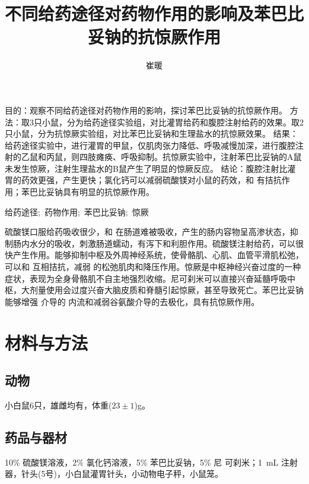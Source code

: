 \documentclass[lang=cn,11pt,a4paper,cite=super,AutoFakeBold,chinesefont=founder]{elegantpaper}
\title{不同给药途径对药物作用的影响及苯巴比妥钠的抗惊厥作用}
\author{崔暖}
\institute{（湖北民族大学\ 医学部，湖北恩施\ 445000）\vspace*{-3em}}
\date{}
\newcommand{\cnabs}{\noindent{\small \textsf{摘要}}\quad}
\newcommand{\cnkys}{\noindent{\small \textsf{关键词}}\quad}
\begin{document}
\maketitle

\renewcommand{\abstractname}{}

\begin{onecolabstract}
\cnabs
目的：观察不同给药途径对药物作用的影响，探讨苯巴比妥钠的抗惊厥作用。%
方法：取3只小鼠，分为给药途径实验组，对比灌胃给药和腹腔注射给药的效果。取2只小鼠，分为抗惊厥实验组，对比苯巴比妥钠和生理盐水的抗惊厥效果。%
结果：给药途径实验中，进行灌胃的甲鼠，仅肌肉张力降低、呼吸减慢加深，进行腹腔注射的乙鼠和丙鼠，则四肢瘫痪、呼吸抑制。抗惊厥实验中，注射苯巴比妥钠的A鼠未发生惊厥，注射生理盐水的B鼠产生了明显的惊厥反应。%
结论：腹腔注射比灌胃的药效更强，产生更快；氯化钙可以减弱硫酸镁对小鼠的药效，和 有拮抗作用；苯巴比妥钠具有明显的抗惊厥作用。%

\cnkys
给药途径;\ 药物作用;\ 苯巴比妥钠;\ 惊厥
\end{onecolabstract}

硫酸镁口服给药吸收很少，和 在肠道难被吸收\cite{cn2}，产生的肠内容物呈高渗状态，抑制肠内水分的吸收，刺激肠道蠕动，有泻下和利胆作用。硫酸镁注射给药，可以很快产生作用。能够抑制中枢及外周神经系统，使骨骼肌、心肌、血管平滑肌松弛，可以和 互相拮抗，减弱 的松弛肌肉和降压作用。惊厥是中枢神经兴奋过度的一种症状，表现为全身骨骼肌不自主地强烈收缩。尼可刹米可以直接兴奋延髓呼吸中枢，大剂量使用会过度兴奋大脑皮质和脊髓引起惊厥，甚至导致死亡。苯巴比妥钠能够增强 介导的 内流和减弱谷氨酸介导的去极化，具有抗惊厥作用\cite{cn1}。

\section{材料与方法}

\subsection{动物}

小白鼠6只，雄雌均有，体重($23 \pm 1$)g。

\subsection{药品与器材}

10\% 硫酸镁溶液，2\% 氯化钙溶液，5\% 苯巴比妥钠，5\% 尼
可刹米；\SI{1}{mL} 注射器，针头(5号)，小白鼠灌胃针头，小动物电子秤，小鼠笼。
\end{document}

